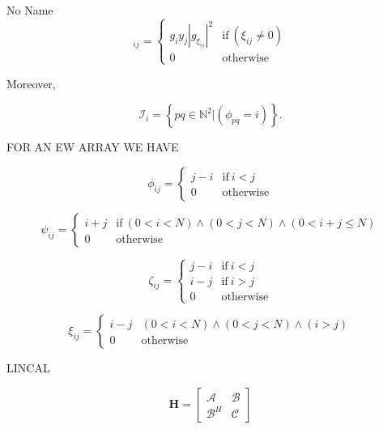\documentclass[a4paper,10pt]{article}
\begin{document}
\begin{section}{No Name}
\begin{equation}
[\boldsymbol{G}]_{ij} = 
\begin{cases}
 g_i y_j  \left | g_{\xi_{ij}} \right |^2  & \textrm{if} ~ (\xi_{ij}\neq0)\\
 0 & \textrm{otherwise}
\end{cases}
\end{equation}

Moreover, 

\begin{equation}
\mathcal{I}_i = \left\{pq\in\mathbb{N}^2|(\phi_{pq} = i) \right\}.
\end{equation}

FOR AN EW ARRAY WE HAVE

\begin{equation}
\phi_{ij} = 
\begin{cases}
j - i & \textrm{if}~i<j\\
0 & \textrm{otherwise}
\end{cases}
\end{equation}

\begin{equation}
\psi_{ij} = 
\begin{cases}
i+j & \textrm{if}~(0<i<N)\wedge(0<j<N)\wedge(0< i+j \leq N)\\
0 & \textrm{otherwise}
\end{cases}
\end{equation}

\begin{equation}
\zeta_{ij} = 
\begin{cases}
j - i & \textrm{if}~i<j\\
i - j & \textrm{if}~i>j\\
0 & \textrm{otherwise}
\end{cases}
\end{equation}

\begin{equation}
\xi_{ij} = 
\begin{cases}
i-j & (0<i<N)\wedge(0<j<N)\wedge(i>j)\\
0 & \textrm{otherwise}
\end{cases}
\end{equation}

LINCAL

\begin{equation}
\boldsymbol{H} =
\begin{bmatrix}
\boldsymbol{\mathcal{A}} & \boldsymbol{\mathcal{B}}\\
\boldsymbol{\mathcal{B}}^H & \boldsymbol{\mathcal{C}}
\end{bmatrix}
\end{equation}


\end{section}
\end{document}
